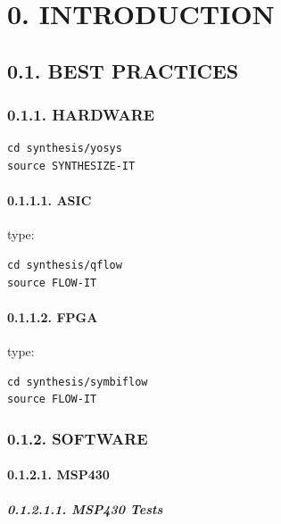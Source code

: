 \documentclass[
]{article}
\begin{document}
\hypertarget{introduction-1}{%
\section{0. INTRODUCTION}\label{introduction-1}}

\hypertarget{best-practices-1}{%
\subsection{0.1. BEST PRACTICES}\label{best-practices-1}}

\hypertarget{hardware-1}{%
\subsubsection{0.1.1. HARDWARE}\label{hardware-1}}

\begin{verbatim}
cd synthesis/yosys
source SYNTHESIZE-IT
\end{verbatim}

\hypertarget{asic-1}{%
\paragraph{0.1.1.1. ASIC}\label{asic-1}}

type:

\begin{verbatim}
cd synthesis/qflow
source FLOW-IT
\end{verbatim}

\hypertarget{fpga-1}{%
\paragraph{0.1.1.2. FPGA}\label{fpga-1}}

type:

\begin{verbatim}
cd synthesis/symbiflow
source FLOW-IT
\end{verbatim}

\hypertarget{software-1}{%
\subsubsection{0.1.2. SOFTWARE}\label{software-1}}

\hypertarget{msp430-3}{%
\paragraph{0.1.2.1. MSP430}\label{msp430-3}}

\hypertarget{msp430-tests-1}{%
\subparagraph{0.1.2.1.1. MSP430 Tests}\label{msp430-tests-1}}
\end{document}
